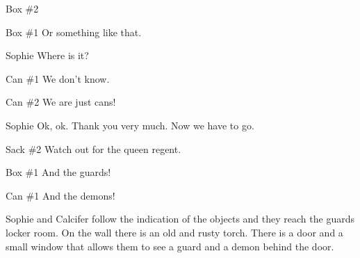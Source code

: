 \begin{screenplay}
\begin{dialogue}{Box \#{}2}
\end{dialogue}
\begin{dialogue}{Box \#{}1}
Or something like that.
\end{dialogue}
\begin{dialogue}{Sophie}
Where is it?
\end{dialogue}
\begin{dialogue}{Can \#{}1}
We don’t know.
\end{dialogue}
\begin{dialogue}{Can \#{}2}
We are just cans!
\end{dialogue}
\begin{dialogue}{Sophie}
Ok, ok. Thank you very much. Now we have to go.
\end{dialogue}
\begin{dialogue}{Sack \#{}2}
Watch out for the queen regent.
\end{dialogue}
\begin{dialogue}{Box \#{}1}
And the guards!
\end{dialogue}
\begin{dialogue}{Can \#{}1}
And the demons!
\end{dialogue}
\end{screenplay}
\vspace{1em}


Sophie and Calcifer follow the indication of the objects and they reach the guards locker room. On the wall there is an old and rusty torch. There is a door and a small window that allows them to see a guard and a demon behind the door.

